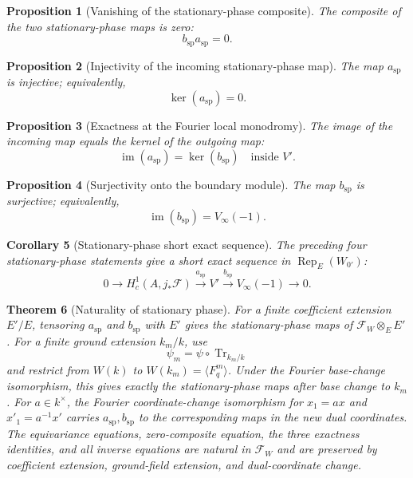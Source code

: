 \documentclass[10pt]{article}
\newtheorem{theorem}{Theorem}[section]
\newtheorem{proposition}[theorem]{Proposition}
\newtheorem{corollary}[theorem]{Corollary}
\theoremstyle{definition}
\begin{document}
\begin{proposition}[Vanishing of the stationary-phase composite]
The composite of the two stationary-phase maps is zero:
\[
 b_{\mathrm{sp}}a_{\mathrm{sp}}=0.
\]
\end{proposition}

\begin{proposition}[Injectivity of the incoming stationary-phase map]
The map \(a_{\mathrm{sp}}\) is injective; equivalently,
\[
 \ker(a_{\mathrm{sp}})=0.
\]
\end{proposition}

\begin{proposition}[Exactness at the Fourier local monodromy]
The image of the incoming map equals the kernel of the outgoing map:
\[
 \operatorname{im}(a_{\mathrm{sp}})=\ker(b_{\mathrm{sp}})
 \quad\text{inside }V'.
\]
\end{proposition}

\begin{proposition}[Surjectivity onto the boundary module]
The map \(b_{\mathrm{sp}}\) is surjective; equivalently,
\[
 \operatorname{im}(b_{\mathrm{sp}})=V_\infty(-1).
\]
\end{proposition}

\begin{corollary}[Stationary-phase short exact sequence]
The preceding four stationary-phase statements give a short exact sequence in
\(\operatorname{Rep}_E(W_{0'})\):
\[
 0\longrightarrow H_c^1(A,j_*\mathcal F)
 \xrightarrow{a_{\mathrm{sp}}}V'
 \xrightarrow{b_{\mathrm{sp}}}V_\infty(-1)
 \longrightarrow0.
\]
\end{corollary}

\begin{theorem}[Naturality of stationary phase]
For a finite coefficient extension \(E'/E\), tensoring
\(a_{\mathrm{sp}}\) and \(b_{\mathrm{sp}}\) with \(E'\) gives the
stationary-phase maps of \(\mathcal F_W\otimes_EE'\).  For a finite ground
extension \(k_m/k\), use
\[
 \psi_m=\psi\circ\operatorname{Tr}_{k_m/k}
\]
and restrict from \(W(k)\) to
\(W(k_m)=\langle F_q^m\rangle\).  Under the Fourier base-change isomorphism,
this gives exactly the stationary-phase maps after base change to \(k_m\).
For \(a\in k^\times\), the Fourier coordinate-change isomorphism for
\(x_1=ax\) and \(x'_1=a^{-1}x'\) carries
\(a_{\mathrm{sp}},b_{\mathrm{sp}}\) to the corresponding maps in the new
dual coordinates.  The equivariance equations, zero-composite equation,
the three exactness identities, and all inverse equations are natural in
\(\mathcal F_W\) and are preserved by coefficient extension, ground-field
extension, and dual-coordinate change.
\end{theorem}
\end{document}
